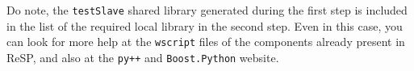 \indent Do note, the \texttt{testSlave} shared library generated during the first step is included in the list of the required local library in the second step. Even in this case, you can look for more help at the \texttt{wscript} files of the components already present in ReSP, and also at the \texttt{py++} and \texttt{Boost.Python} website. 
